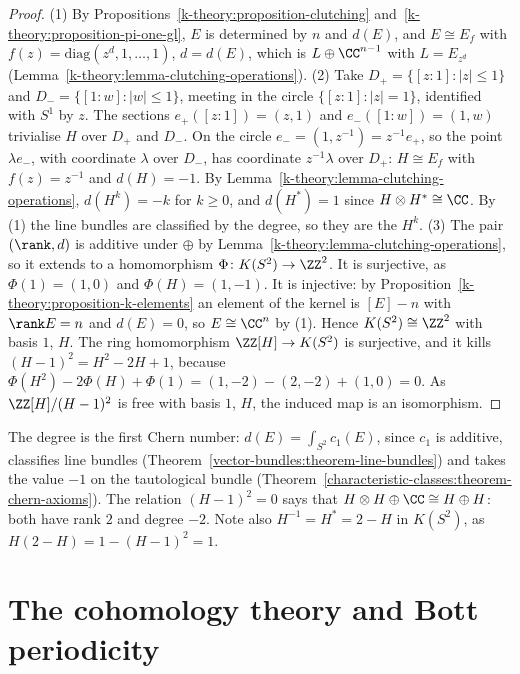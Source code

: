 \begin{proof}
(1) By Propositions~\ref{k-theory:proposition-clutching} and~\ref{k-theory:proposition-pi-one-gl}, $E$ is determined by $n$ and $d(E)$, and $E \cong E_f$ with $f(z) = \mathrm{diag}(z^{d}, 1, \ldots, 1)$,
$d = d(E)$, which is $L \oplus \CC^{n-1}$ with $L = E_{z^d}$ (Lemma~\ref{k-theory:lemma-clutching-operations}).
(2) Take $D_+ = \{[z : 1] : |z| \leq 1\}$ and $D_- = \{[1 : w] : |w| \leq 1\}$, meeting in the circle $\{[z : 1] : |z| = 1\}$, identified with $S^1$ by $z$. The sections $e_+([z : 1]) = (z, 1)$ and
$e_-([1 : w]) = (1, w)$ trivialise $H$ over $D_+$ and $D_-$. On the circle $e_- = (1, z^{-1}) = z^{-1}e_+$, so the point $\lambda e_-$, with coordinate $\lambda$ over $D_-$, has coordinate $z^{-1}\lambda$ over
$D_+$: $H \cong E_f$ with $f(z) = z^{-1}$ and $d(H) = -1$. By Lemma~\ref{k-theory:lemma-clutching-operations}, $d(H^k) = -k$ for $k \geq 0$, and $d(H^*) = 1$ since $H \otimes H^* \cong \CC$. By (1) the line bundles
are classified by the degree, so they are the $H^k$.
(3) The pair $(\rank, d)$ is additive under $\oplus$ by Lemma~\ref{k-theory:lemma-clutching-operations}, so it extends to a homomorphism $\Phi \colon K(S^2) \to \ZZ^2$. It is surjective, as
$\Phi(1) = (1, 0)$ and $\Phi(H) = (1, -1)$. It is injective: by Proposition~\ref{k-theory:proposition-k-elements} an element of the kernel is $[E] - n$ with $\rank E = n$ and $d(E) = 0$, so
$E \cong \CC^n$ by (1). Hence $K(S^2) \cong \ZZ^2$ with basis $1$, $H$. The ring homomorphism $\ZZ[H] \to K(S^2)$ is surjective, and it kills $(H - 1)^2 = H^2 - 2H + 1$, because
$\Phi(H^2) - 2\Phi(H) + \Phi(1) = (1, -2) - (2, -2) + (1, 0) = 0$. As $\ZZ[H]/(H - 1)^2$ is free with basis $1$, $H$, the induced map is an isomorphism.
\end{proof}

\begin{remark}\label{k-theory:remark-degree-chern}
The degree is the first Chern number: $d(E) = \int_{S^2}c_1(E)$, since $c_1$ is additive, classifies line bundles (Theorem~\ref{vector-bundles:theorem-line-bundles}) and takes the value $-1$ on the
tautological bundle (Theorem~\ref{characteristic-classes:theorem-chern-axioms}). The relation $(H - 1)^2 = 0$ says that $H \otimes H \oplus \CC \cong H \oplus H$: both have rank $2$ and degree $-2$. Note also
$H^{-1} = H^* = 2 - H$ in $K(S^2)$, as $H(2 - H) = 1 - (H - 1)^2 = 1$.
\end{remark}

\section{The cohomology theory and Bott periodicity}\label{k-theory:section-cohomology-theory}

